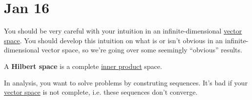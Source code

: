 \section{Jan 16} 

	You should be very careful with your intuition in an infinite-dimensional \hyperref[lin-def:vector-space]{vector space}. You should develop this intuition on what is or isn't obvious in an infinite-dimensional vector space, so we're going over some seemingly ``obvious'' results. 

	\begin{definition}
	  \label{def:hilbert-space}
		A \textbf{Hilbert space} is a complete \hyperref[lin-def:inner-product]{inner product} space. 
	\end{definition}

	In analysis, you want to solve problems by construting sequences. It's bad if your \hyperref[lin-def:vector-space]{vector space} is not complete, i.e. these sequences don't converge. 

